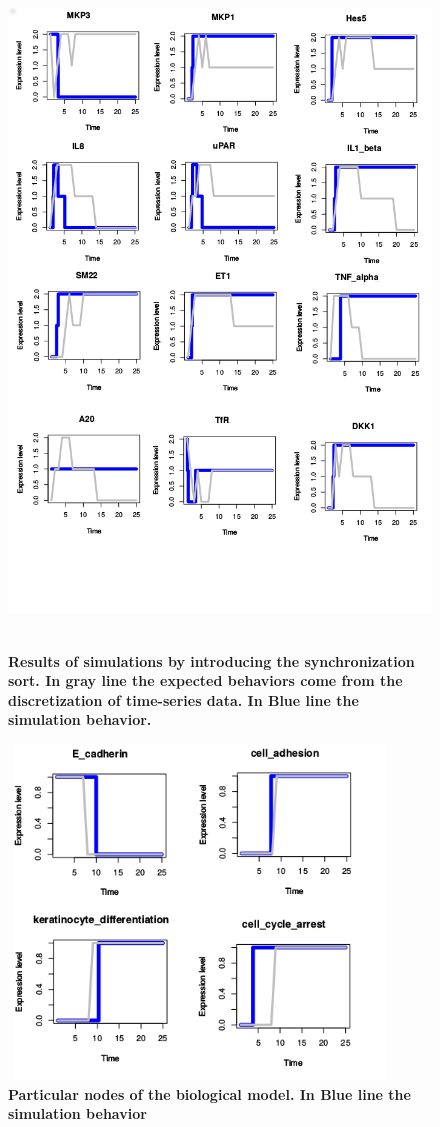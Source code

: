 \begin{figure}[!t]
\centering
\includegraphics[width=5in,height=7in]{images/12genes_sim.png}
\caption{\bf Results of simulations by introducing the synchronization sort. In gray line the expected behaviors
come from the discretization of time-series data. In Blue line the simulation behavior.}
\label{fig:rws}
\end{figure}



\begin{figure}[!t]
\centering
\includegraphics[width=4in,height=3.5in]{images/key_nodes1.png}
\caption{\bf Particular nodes of the biological model. In Blue line the simulation behavior}
\label{fig:knodes}
\end{figure}



